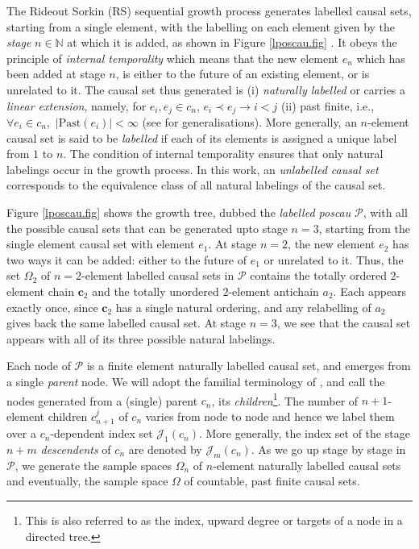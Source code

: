 \documentclass[11pt]{article}
\newcommand{\cP}{\mathcal P}
\newcommand{\bN}{\mathbb N}
\newcommand{\chain}{\mathbf c}
\newcommand{\achain}{a}
\newcommand{\cJ}{\mathcal J}
\newcommand{\Past}{\mathrm{Past}}
\begin{document}
The Rideout Sorkin (RS)  sequential growth process  generates labelled causal sets, starting from a
single element, with the labelling on each element given by the
{\sl stage}  $n \in \bN$ at which it is added, as shown in Figure
\ref{lposcau.fig}  \cite{csgone}.  It obeys the principle of {\sl
  internal temporality} which means that the new element $e_n$ which
has been added at stage $n$, is  either to the future of an existing
element, or is  unrelated to it. The causal set thus generated is (i) {\sl
  naturally labelled} or carries a {\sl linear extension}, namely,
for $e_i, e_j \in c_n$, $e_i \prec e_j \rightarrow i <j$ (ii)  past
finite, i.e., $\forall e_i \in c_n,  \, \, |\Past(e_i)| < \infty$ (see
\cite{bdz} for generalisations).   More generally, an $n$-element
causal set is said to be {\sl labelled}  if each of its
elements is assigned a unique label from $1$ to $n$. The condition of internal temporality
ensures that only natural labelings occur in the growth 
process.  In this work, an  {\sl unlabelled causal set}  corresponds to the equivalence class
of all natural  labelings of the  causal set.   






Figure \ref{lposcau.fig} shows  the growth tree, dubbed the {\sl labelled
poscau} $\cP$,      with all the
possible causal sets that can be generated upto stage 
 $n=3$, starting from the single element causal set with element
 $e_1$.  At stage $n=2$, the new element $e_2$ has two ways it can be
 added: either to the future of $e_1$ or unrelated to it. Thus, the
 set $\Omega_2$ of $n=2$-element labelled causal sets in  $\cP$
 contains the totally ordered $2$-element chain $\chain_2$ and the
 totally unordered $2$-element antichain $\achain_2$. 
 Each appears
 exactly once, since $\chain_2$ has a single natural ordering, and
 any relabelling of $\achain_2$ gives back the same labelled causal
 set. At stage $n=3$, we see that the causal set   
 appears with all of its three possible natural labelings. 

Each node of $\cP$ is a finite element naturally labelled causal 
set,  and emerges  from a single {\sl parent} node. We will
adopt the familial terminology of \cite{csgone}, and call the nodes
generated from a (single) parent  $c_n$, its
{\sl children}\footnote{This is also referred to as the index, upward degree or 
  targets of a  node in a directed tree.}. The  number of 
$n+1$-element children $c_{n+1}^j$ of $c_n$ varies from node to node
and hence we  label them over a  $c_n$-dependent  index set
$\cJ_1(c_n)$.  More generally, the index set of the stage $n+m$  {\sl descendents}  of
$c_n$  are denoted by  $\cJ_m(c_n)$.  As we go up stage by
stage in  $\cP$,  we generate the sample spaces  $\Omega_n$  of $n$-element
naturally labelled causal sets and eventually,  the sample space $\Omega$ of countable,
past finite causal sets.
\end{document}
